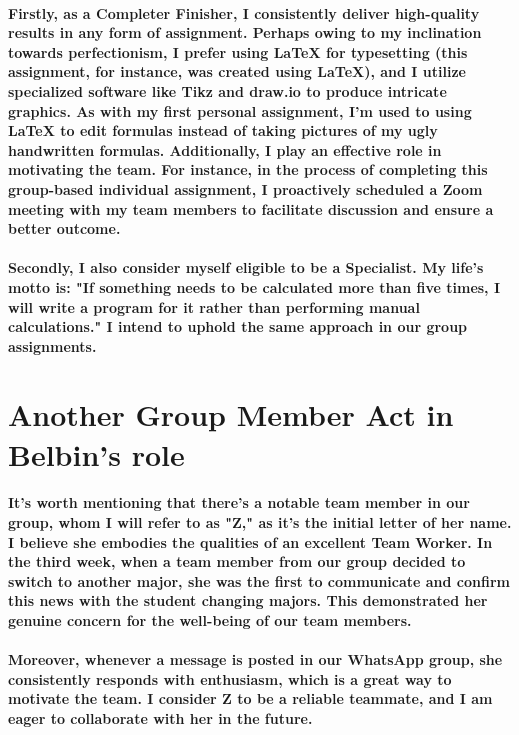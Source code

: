 \documentclass[11pt]{article} %
\begin{document}
\paragraph{Firstly, as a Completer Finisher, I consistently deliver high-quality results in any form of assignment. Perhaps owing to my inclination towards perfectionism, I prefer using LaTeX for typesetting (this assignment, for instance, was created using LaTeX), and I utilize specialized software like Tikz and draw.io to produce intricate graphics. As with my first personal assignment, I'm used to using LaTeX to edit formulas instead of taking pictures of my ugly handwritten formulas. Additionally, I play an effective role in motivating the team. For instance, in the process of completing this group-based individual assignment, I proactively scheduled a Zoom meeting with my team members to facilitate discussion and ensure a better outcome.}
% 
\paragraph{Secondly, I also consider myself eligible to be a Specialist. My life's motto is: "If something needs to be calculated more than five times, I will write a program for it rather than performing manual calculations." I intend to uphold the same approach in our group assignments.}
% 
% 
% 
% 
% 
% 
% 
\section{Another Group Member Act in Belbin's role}
% 
\paragraph{It's worth mentioning that there's a notable team member in our group, whom I will refer to as "Z," as it's the initial letter of her name. I believe she embodies the qualities of an excellent Team Worker. In the third week, when a team member from our group decided to switch to another major, she was the first to communicate and confirm this news with the student changing majors. This demonstrated her genuine concern for the well-being of our team members. }
% 
\paragraph{Moreover, whenever a message is posted in our WhatsApp group, she consistently responds with enthusiasm, which is a great way to motivate the team. I consider Z to be a reliable teammate, and I am eager to collaborate with her in the future.}
% 
% 
% 
% 
\end{document}
